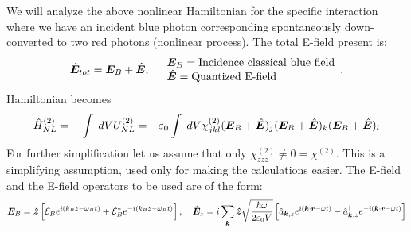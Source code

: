We will analyze the above nonlinear Hamiltonian for the specific interaction where we have an incident blue photon corresponding 
spontaneously down-converted to two red photons (nonlinear process).
The total E-field present is:
\begin{align*}
    \hat{\bm{E}}_{tot}=\bm{E}_B+\hat{\bm{E}},\quad\begin{array}{l}
        \bm{E}_B=\text{Incidence classical blue field}\\
        \hat{\bm{E}}=\text{Quantized E-field}
    \end{array}.
\end{align*}
Hamiltonian becomes 
\begin{align*}
    \hat{H}_{NL}^{(2)}=-\int\;dVU^{(2)}_{NL}=-\varepsilon_0\int\;dV\chi^{(2)}_{jkl}(\bm{E}_B+\hat{\bm{E}})_j(\bm{E}_B+\hat{\bm{E}})_k(\bm{E}_B+\hat{\bm{E}})_l
\end{align*}
For further simplification let us assume that only $\chi^{(2)}_{zzz}\neq0=\chi^{(2)}$. This is a simplifying assumption, used only for making the calculations 
easier. The E-field and the E-field operators to be used are of the form:
\begin{align*}
    \bm{E}_B=\bm{\hat{z}}\left[\mathcal{E}_Be^{i(k_Bz-\omega_B t)}+\mathcal{E}_B^*e^{-i(k_Bz-\omega_B t)}\right],\quad
    \hat{\bm{E}}_z=i\sum_{\bm{k}}\bm{\hat{z}}\sqrt{\frac{\hbar\omega}{2\varepsilon_0V}}\left[\hat{a}_{\bm{k},z}e^{i(\bm{k}\cdot\bm{r}-\omega t)}-\hat{a}^\dagger_{\bm{k},z}e^{-i(\bm{k}\cdot\bm{r}-\omega t)}\right]
\end{align*}

